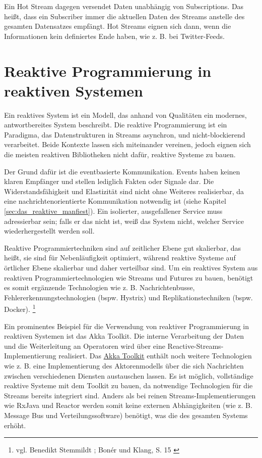 Ein Hot Stream dagegen versendet Daten unabhängig von Subscriptions. Das heißt, dass ein Subscriber immer die aktuellen Daten des Streams anstelle des gesamten Datensatzes empfängt. Hot Streams eignen sich dann, wenn die Informationen kein definiertes Ende haben, wie z. B. bei Twitter-Feeds. 

\section{Reaktive Programmierung in reaktiven Systemen}
\label{sec:rpinrs}
Ein reaktives System ist ein Modell, das anhand von Qualitäten ein modernes, antwortbereites System beschreibt. Die reaktive Programmierung ist ein Paradigma, das Datenstrukturen in Streams asynchron, und nicht-blockierend verarbeitet. Beide Kontexte lassen sich miteinander vereinen, jedoch eignen sich die meisten reaktiven Bibliotheken nicht dafür, reaktive Systeme zu bauen.

Der Grund dafür ist die eventbasierte Kommunikation. Events haben keinen klaren Empfänger und stellen lediglich Fakten oder Signale dar. Die Widerstandsfähigkeit und Elastizität sind nicht ohne Weiteres realisierbar, da eine nachrichtenorientierte Kommunikation notwendig ist (siehe Kapitel \ref{sec:das_reaktive_manfiest}). Ein isolierter, ausgefallener Service muss adressierbar sein; falls er das nicht ist, weiß das System nicht, welcher Service wiederhergestellt werden soll.

Reaktive Programmiertechniken sind auf zeitlicher Ebene gut skalierbar, das heißt, sie sind für Nebenläufigkeit optimiert, während reaktive Systeme auf örtlicher Ebene skalierbar und daher verteilbar sind. Um ein reaktives System aus reaktiven Programmiertechnologien wie Streams und Futures zu bauen, benötigt es somit ergänzende Technologien wie z. B. Nachrichtenbusse, Fehlererkennungstechnologien (bspw. Hystrix) und Replikationstechniken (bspw. Docker).
\footnote{vgl. Benedikt Stemmildt \cite{web:youtube:going_reactive}; Bonér und Klang, S. 15 \cite{technischer_bericht:lightbend:rpvsrs}}

Ein prominentes Beispiel für die Verwendung von reaktiver Programmierung in reaktiven Systemen ist das Akka Toolkit. Die interne Verarbeitung der Daten und die Weiterleitung an Operatoren wird über eine Reactive-Streams-Implementierung realisiert. Das \href{https://akka.io/docs/}{Akka Toolkit} enthält noch weitere Technologien wie z. B. eine Implementierung des Aktorenmodells über die sich Nachrichten zwischen verschiedenen Diensten austauschen lassen. Es ist möglich, vollständige reaktive Systeme mit dem Toolkit zu bauen, da notwendige Technologien für die Streams bereits integriert sind. Anders als bei reinen Streams-Implementierungen wie RxJava und Reactor werden somit keine externen Abhängigkeiten (wie z. B. Message Bus und Verteilungssoftware) benötigt, was die  des gesamten Systems erhöht.

